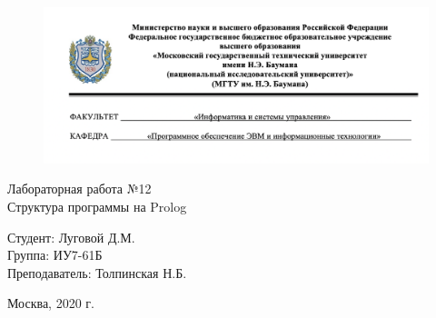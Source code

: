 \begin{figure}[h!]
	\begin{center}
		{\includegraphics[width = \textwidth]{titul.png}}
	\end{center}
\end{figure}

\vspace*{20mm}

\huge
\begin{center}
	Лабораторная работа №12\\
	Структура программы на Prolog
\end{center}


\vspace*{45mm}

\large
\begin{flushleft}
	Студент: Луговой Д.М. \\
	Группа: ИУ7-61Б \\
	Преподаватель: Толпинская Н.Б.
\end{flushleft}

\vspace*{55mm}

\large
\begin{center}
	Москва, 2020 г.
\end{center}

\thispagestyle{empty}